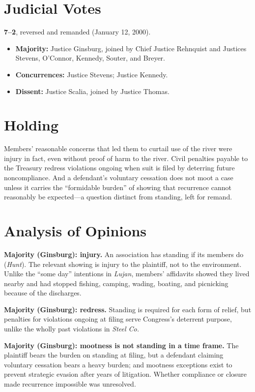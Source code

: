 \documentclass[12pt]{article}
\begin{document}
\section{Judicial Votes}

\textbf{7--2}, reversed and remanded (January 12, 2000).
\begin{itemize}
\item \textbf{Majority:} Justice Ginsburg, joined by Chief Justice Rehnquist and Justices Stevens, O'Connor, Kennedy, Souter, and Breyer.
\item \textbf{Concurrences:} Justice Stevens; Justice Kennedy.
\item \textbf{Dissent:} Justice Scalia, joined by Justice Thomas.
\end{itemize}

\section{Holding}

Members' reasonable concerns that led them to curtail use of the river were injury in fact, even without proof of harm to the river. Civil penalties payable to the Treasury redress violations ongoing when suit is filed by deterring future noncompliance. And a defendant's voluntary cessation does not moot a case unless it carries the ``formidable burden'' of showing that recurrence cannot reasonably be expected---a question distinct from standing, left for remand.

\section{Analysis of Opinions}

\textbf{Majority (Ginsburg): injury.} An association has standing if its members do (\textit{Hunt}). The relevant showing is injury to the plaintiff, not to the environment. Unlike the ``some day'' intentions in \textit{Lujan}, members' affidavits showed they lived nearby and had stopped fishing, camping, wading, boating, and picnicking because of the discharges.

\textbf{Majority (Ginsburg): redress.} Standing is required for each form of relief, but penalties for violations ongoing at filing serve Congress's deterrent purpose, unlike the wholly past violations in \textit{Steel Co.}

\textbf{Majority (Ginsburg): mootness is not standing in a time frame.} The plaintiff bears the burden on standing at filing, but a defendant claiming voluntary cessation bears a heavy burden; and mootness exceptions exist to prevent strategic evasion after years of litigation. Whether compliance or closure made recurrence impossible was unresolved.
\end{document}
